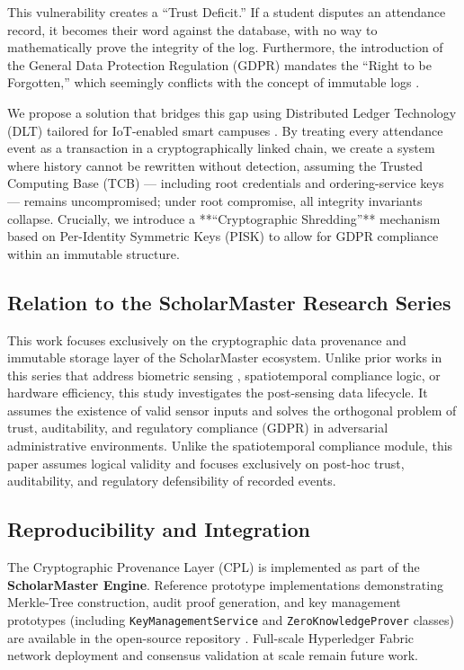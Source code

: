 \documentclass[conference]{IEEEtran}
\begin{document}
This vulnerability creates a ``Trust Deficit.'' If a student disputes an attendance record, it becomes their word against the database, with no way to mathematically prove the integrity of the log. Furthermore, the introduction of the General Data Protection Regulation (GDPR) mandates the ``Right to be Forgotten,'' which seemingly conflicts with the concept of immutable logs \cite{b23, b9}.

We propose a solution that bridges this gap using Distributed Ledger Technology (DLT) tailored for IoT-enabled smart campuses \cite{b20, b21}. By treating every attendance event as a transaction in a cryptographically linked chain, we create a system where history cannot be rewritten without detection, assuming the Trusted Computing Base (TCB) — including root credentials and ordering-service keys — remains uncompromised; under root compromise, all integrity invariants collapse. Crucially, we introduce a **``Cryptographic Shredding''** mechanism based on Per-Identity Symmetric Keys (PISK) to allow for GDPR compliance within an immutable structure.

\subsection{Relation to the ScholarMaster Research Series}
This work focuses exclusively on the cryptographic data provenance and immutable storage layer of the ScholarMaster ecosystem. Unlike prior works in this series that address biometric sensing \cite{b19}, spatiotemporal compliance logic, or hardware efficiency, this study investigates the post-sensing data lifecycle. It assumes the existence of valid sensor inputs and solves the orthogonal problem of trust, auditability, and regulatory compliance (GDPR) in adversarial administrative environments. Unlike the spatiotemporal compliance module, this paper assumes logical validity and focuses exclusively on post-hoc trust, auditability, and regulatory defensibility of recorded events.

\subsection{Reproducibility and Integration}
The Cryptographic Provenance Layer (CPL) is implemented as part of the \textbf{ScholarMaster Engine}. Reference prototype implementations demonstrating Merkle-Tree construction, audit proof generation, and key management prototypes (including \texttt{KeyManagementService} and \texttt{ZeroKnowledgeProver} classes) are available in the open-source repository \cite{scholarmaster_repo}. Full-scale Hyperledger Fabric network deployment and consensus validation at scale remain future work.
\end{document}
